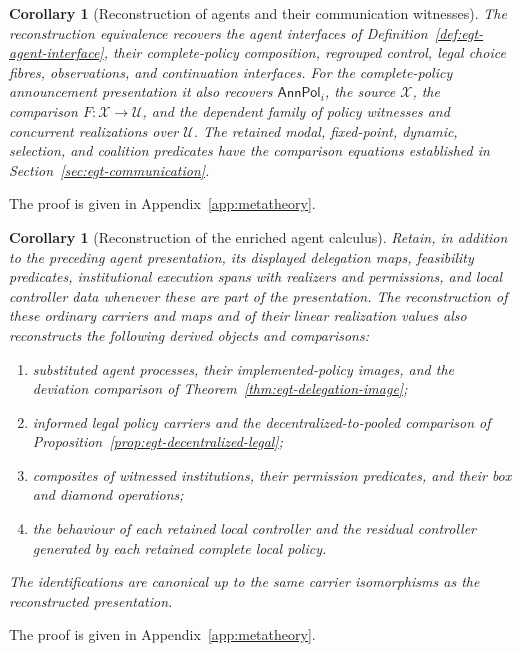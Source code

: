 \documentclass[11pt,a4paper]{article}
\numberwithin{equation}{section}
\newtheorem{corollary}[theorem]{Corollary}
\theoremstyle{definition}
\theoremstyle{remark}
\theoremstyle{plain}
\begin{document}
\begin{corollary}[Reconstruction of agents and their communication witnesses]
\label{cor:egt-agent-reconstruction}
The reconstruction equivalence recovers the agent interfaces of
Definition~\ref{def:egt-agent-interface}, their complete-policy composition,
regrouped control, legal choice fibres, observations, and continuation
interfaces. For the complete-policy announcement presentation it also
recovers $\mathsf{AnnPol}_i$, the source $\mathcal X$, the comparison
$F:\mathcal X\to\mathcal U$, and the dependent family of policy witnesses
and concurrent realizations over $\mathcal U$. The retained modal,
fixed-point, dynamic, selection, and coalition predicates have the comparison
equations established in Section~\ref{sec:egt-communication}.
\end{corollary}
\par\noindent The proof is given in Appendix~\ref{app:metatheory}.

\begin{corollary}[Reconstruction of the enriched agent calculus]
\label{cor:egt-enriched-agent-reconstruction}
Retain, in addition to the preceding agent presentation, its displayed
delegation maps, feasibility predicates, institutional execution spans
with realizers and permissions, and local controller data whenever
these are part of the presentation. The reconstruction of these
ordinary carriers and maps and of their linear realization values
also reconstructs the following derived objects and comparisons:
\begin{enumerate}
 \item substituted agent processes, their implemented-policy images,
       and the deviation comparison of
       Theorem~\ref{thm:egt-delegation-image};
 \item informed legal policy carriers and the decentralized-to-pooled
       comparison of Proposition~\ref{prop:egt-decentralized-legal};
 \item composites of witnessed institutions, their permission
       predicates, and their box and diamond operations;
 \item the behaviour of each retained local controller and the
       residual controller generated by each retained complete local policy.
\end{enumerate}
The identifications are canonical up to the same carrier isomorphisms
as the reconstructed presentation.
\end{corollary}
\par\noindent The proof is given in Appendix~\ref{app:metatheory}.
\end{document}
